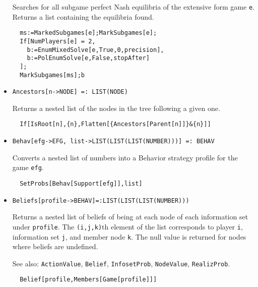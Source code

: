 \begin{itemize}
\bd 
Searches for all subgame perfect Nash equilibria of the extensive
form game \verb+e+.  Returns a list containing the equilibria found.

\begin{verbatim}
  ms:=MarkedSubgames[e];MarkSubgames[e];
  If[NumPlayers[e] = 2, 
    b:=EnumMixedSolve[e,True,0,precision],
    b:=PolEnumSolve[e,False,stopAfter]
  ];
  MarkSubgames[ms];b
\end{verbatim} 
\ed

\item{}
\protect \large \begin{verbatim}
Ancestors[n->NODE] =: LIST(NODE) 
\end{verbatim}\normalsize

\bd 
Returns a nested list of the nodes in the tree following a given one.  
\begin{verbatim}
  If[IsRoot[n],{n},Flatten[{Ancestors[Parent[n]]}&{n}]]
\end{verbatim} 
\ed



\item{}
\protect \large \begin{verbatim}
Behav[efg->EFG, list->LIST(LIST(LIST(NUMBER)))] =: BEHAV 
\end{verbatim}\normalsize

\bd 
Converts a nested list of numbers into a Behavior strategy
profile for the game \verb+efg+.
\begin{verbatim}
  SetProbs[Behav[Support[efg]],list]
\end{verbatim} 
\ed

\item{}
\protect \large \begin{verbatim}
Beliefs[profile->BEHAV]=:LIST(LIST(LIST(NUMBER)))
\end{verbatim}\normalsize

\bd 
Returns a nested list of
beliefs of being at each node of each information set under
\verb+profile+. The \verb+(i,j,k)+th element of the list corresponds
to player \verb+i+, information set \verb+j+, and member node
\verb+k+. The null value is returned for nodes where beliefs are
undefined.

\item [See also:] \verb+ActionValue+, \verb+Belief+, \verb+InfosetProb+,
\verb+NodeValue+, \verb+RealizProb+.

\begin{verbatim}
  Belief[profile,Members[Game[profile]]]
\end{verbatim}


\end{itemize}
